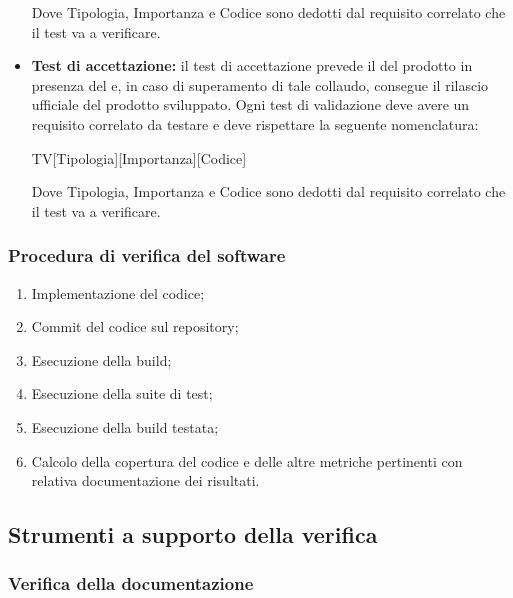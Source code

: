 \documentclass[../NormediProgetto.tex]{subfiles}
\begin{document}
\begin{itemize}
    Dove Tipologia, Importanza e Codice sono dedotti dal requisito correlato che il test va a verificare.

    \item \textbf{Test di accettazione:} il test di accettazione prevede il  del prodotto in presenza del  e, in caso di superamento di tale collaudo, consegue il rilascio ufficiale del prodotto sviluppato. Ogni test di validazione deve avere un requisito correlato da testare e deve rispettare la seguente nomenclatura:

    \begin{center}
        TV[Tipologia][Importanza][Codice]
    \end{center}

    Dove Tipologia, Importanza e Codice sono dedotti dal requisito correlato che il test va a verificare.

\end{itemize}


\subsubsection{Procedura di verifica del software}

\begin{enumerate}
    \item Implementazione del codice;
    
    \item Commit del codice sul repository;
    
    \item Esecuzione della build;
    
    \item Esecuzione della suite di test;
    
    \item Esecuzione della build testata;
    
    \item Calcolo della copertura del codice e delle altre metriche pertinenti con relativa documentazione dei risultati.
\end{enumerate}

\subsection{Strumenti a supporto della verifica}

\subsubsection{Verifica della documentazione}
\end{document}

